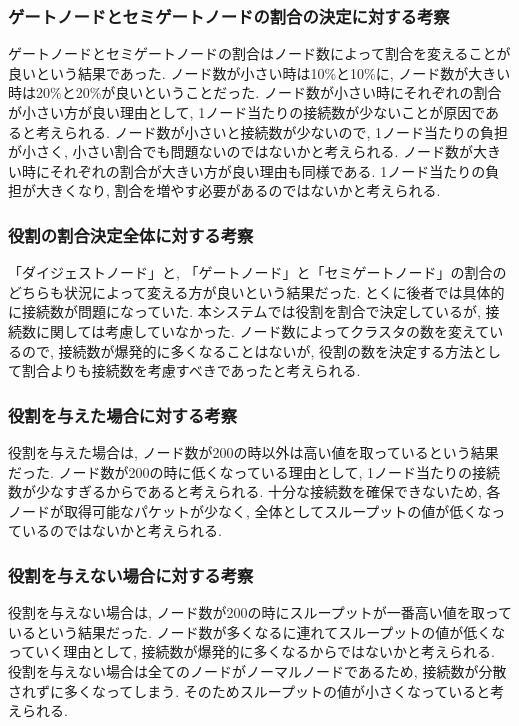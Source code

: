 \subsubsection{ゲートノードとセミゲートノードの割合の決定に対する考察}
ゲートノードとセミゲートノードの割合はノード数によって割合を変えることが良いという結果であった. ノード数が小さい時は10\%と10\%に, ノード数が大きい時は20\%と20\%が良いということだった. ノード数が小さい時にそれぞれの割合が小さい方が良い理由として, 1ノード当たりの接続数が少ないことが原因であると考えられる. ノード数が小さいと接続数が少ないので, 1ノード当たりの負担が小さく, 小さい割合でも問題ないのではないかと考えられる. ノード数が大きい時にそれぞれの割合が大きい方が良い理由も同様である. 1ノード当たりの負担が大きくなり, 割合を増やす必要があるのではないかと考えられる.

\subsubsection{役割の割合決定全体に対する考察}
「ダイジェストノード」と, 「ゲートノード」と「セミゲートノード」の割合のどちらも状況によって変える方が良いという結果だった. とくに後者では具体的に接続数が問題になっていた. 本システムでは役割を割合で決定しているが, 接続数に関しては考慮していなかった. ノード数によってクラスタの数を変えているので, 接続数が爆発的に多くなることはないが, 役割の数を決定する方法として割合よりも接続数を考慮すべきであったと考えられる.

\subsubsection{役割を与えた場合に対する考察}
役割を与えた場合は, ノード数が200の時以外は高い値を取っているという結果だった. ノード数が200の時に低くなっている理由として, 1ノード当たりの接続数が少なすぎるからであると考えられる. 十分な接続数を確保できないため, 各ノードが取得可能なパケットが少なく, 全体としてスループットの値が低くなっているのではないかと考えられる.

\subsubsection{役割を与えない場合に対する考察}
役割を与えない場合は, ノード数が200の時にスループットが一番高い値を取っているという結果だった. ノード数が多くなるに連れてスループットの値が低くなっていく理由として, 接続数が爆発的に多くなるからではないかと考えられる. 役割を与えない場合は全てのノードがノーマルノードであるため, 接続数が分散されずに多くなってしまう. そのためスループットの値が小さくなっていると考えられる.


